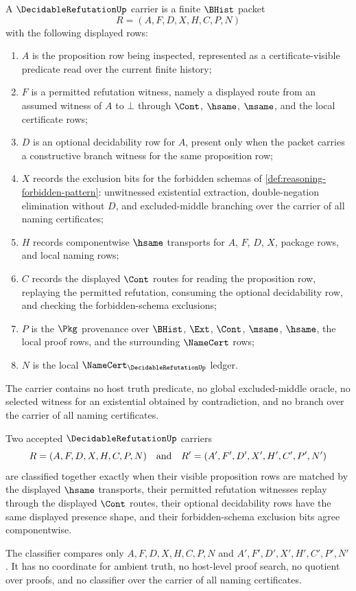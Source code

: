 \begin{definition}
\label{def:decidable-refutation-carrier}
A $\DecidableRefutationUp$ carrier is a finite $\BHist$ packet
$$
R=(A,F,D,X,H,C,P,N)
$$
with the following displayed rows:
\begin{enumerate}
\item $A$ is the proposition row being inspected, represented as a certificate-visible predicate read over the current finite history;
\item $F$ is a permitted refutation witness, namely a displayed route from an assumed witness of $A$ to $\bot$ through $\Cont$, $\hsame$, $\msame$, and the local certificate rows;
\item $D$ is an optional decidability row for $A$, present only when the packet carries a constructive branch witness for the same proposition row;
\item $X$ records the exclusion bits for the forbidden schemas of \autoref{def:reasoning-forbidden-pattern}: unwitnessed existential extraction, double-negation elimination without $D$, and excluded-middle branching over the carrier of all naming certificates;
\item $H$ records componentwise $\hsame$ transports for $A$, $F$, $D$, $X$, package rows, and local naming rows;
\item $C$ records the displayed $\Cont$ routes for reading the proposition row, replaying the permitted refutation, consuming the optional decidability row, and checking the forbidden-schema exclusions;
\item $P$ is the $\Pkg$ provenance over $\BHist$, $\Ext$, $\Cont$, $\msame$, $\hsame$, the local proof rows, and the surrounding $\NameCert$ rows;
\item $N$ is the local $\NameCert_{\DecidableRefutationUp}$ ledger.
\end{enumerate}
The carrier contains no host truth predicate, no global excluded-middle oracle, no selected witness for an existential obtained by contradiction, and no branch over the carrier of all naming certificates.
\end{definition}

\begin{definition}
\label{def:decidable-refutation-classifier}
Two accepted $\DecidableRefutationUp$ carriers
$$
R=(A,F,D,X,H,C,P,N)
\quad\hbox{and}\quad
R'=(A',F',D',X',H',C',P',N')
$$
are classified together exactly when their visible proposition rows are matched by the displayed $\hsame$ transports, their permitted refutation witnesses replay through the displayed $\Cont$ routes, their optional decidability rows have the same displayed presence shape, and their forbidden-schema exclusion bits agree componentwise.

The classifier compares only $A,F,D,X,H,C,P,N$ and $A',F',D',X',H',C',P',N'$. It has no coordinate for ambient truth, no host-level proof search, no quotient over proofs, and no classifier over the carrier of all naming certificates.
\end{definition}

